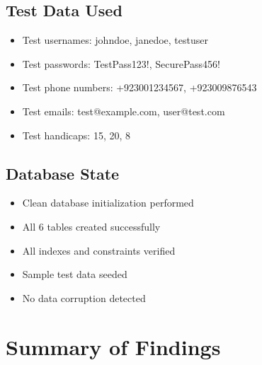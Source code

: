 \documentclass[11pt,a4paper]{article}
\begin{document}
\subsection{Test Data Used}
\begin{itemize}
    \item Test usernames: johndoe, janedoe, testuser
    \item Test passwords: TestPass123!, SecurePass456!
    \item Test phone numbers: +923001234567, +923009876543
    \item Test emails: test@example.com, user@test.com
    \item Test handicaps: 15, 20, 8
\end{itemize}

\subsection{Database State}
\begin{itemize}
    \item Clean database initialization performed
    \item All 6 tables created successfully
    \item All indexes and constraints verified
    \item Sample test data seeded
    \item No data corruption detected
\end{itemize}

\section{Summary of Findings}
\end{document}
